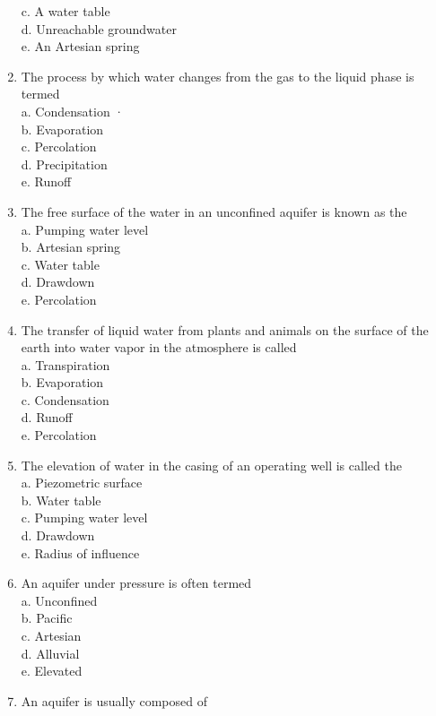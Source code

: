 \begin{enumerate}[1.]
 c. A water table\\
 d. Unreachable groundwater\\
 e. An Artesian spring\\
 \item The process by which water changes from the gas to the liquid phase is termed\\
 a. Condensation ·\\
 b. Evaporation\\
 c. Percolation\\
 d. Precipitation\\
 e. Runoff\\
 \item The free surface of the water in an unconfined aquifer is known as the\\
 a. Pumping water level\\
 b. Artesian spring\\
 c. Water table\\
 d. Drawdown\\
 e. Percolation\\
 \item The transfer of liquid water from plants and animals on the surface of the earth into water vapor in the atmosphere is called\\
 a. Transpiration\\
 b. Evaporation\\
 c. Condensation\\
 d. Runoff\\
 e. Percolation\\
 \item The elevation of water in the casing of an operating well is called the\\
 a. Piezometric surface\\
 b. Water table\\
 c. Pumping water level\\
 d. Drawdown\\
 e. Radius of influence\\
 \item An aquifer under pressure is often termed\\
 a. Unconfined\\
 b. Pacific\\
 c. Artesian\\
 d. Alluvial\\
 e. Elevated\\
 \item An aquifer is usually composed of\\

\end{enumerate}
